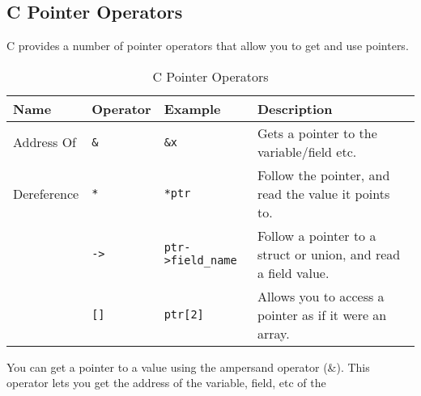 \clearpage

\subsection{C Pointer Operators} %
\label{sub:c_pointer_operators}

C provides a number of pointer operators that allow you to get and use pointers.

\begin{table}[h]
  \centering
  \begin{tabular}{|l|l|l|p{8cm}|}
    \hline
    \textbf{Name} & \textbf{Operator}  & \textbf{Example}  & \textbf{Description} \\
    \hline
    Address Of & \texttt{\&} & \texttt{\&x} & Gets a pointer to the variable/field etc. \\
    \hline
    Dereference & \texttt{*} & \texttt{*ptr} & Follow the pointer, and read the value it points to.\\
    \hline
    & \texttt{->} & \texttt{ptr->field\_name} & Follow a pointer to a struct or union, and read a field value. \\
    \hline
    & \texttt{[]} & \texttt{ptr[2]} & Allows you to access a pointer as if it were an array. \\
    \hline
  \end{tabular}
  \caption{C Pointer Operators}
  \label{tbl:c-ptr-operators}
\end{table}

You can get a pointer to a value using the ampersand operator (\&). This operator lets you get the address of the variable, field, etc of the 



